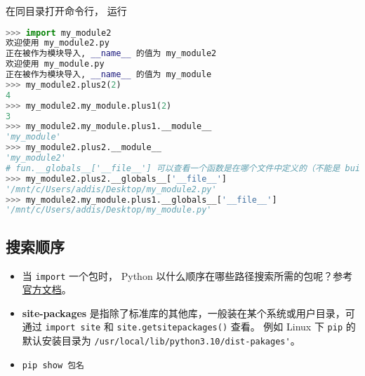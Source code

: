 在同目录打开命令行， 运行
\begin{lstlisting}[language=python]
>>> import my_module2
欢迎使用 my_module2.py
正在被作为模块导入, __name__ 的值为 my_module2
欢迎使用 my_module.py
正在被作为模块导入, __name__ 的值为 my_module
>>> my_module2.plus2(2)
4
>>> my_module2.my_module.plus1(2)
3
>>> my_module2.my_module.plus1.__module__
'my_module'
>>> my_module2.plus2.__module__
'my_module2'
# fun.__globals__['__file__'] 可以查看一个函数是在哪个文件中定义的（不能是 builtin 函数）。
>>> my_module2.plus2.__globals__['__file__']
'/mnt/c/Users/addis/Desktop/my_module2.py'
>>> my_module2.my_module.plus1.__globals__['__file__']
'/mnt/c/Users/addis/Desktop/my_module.py'
\end{lstlisting}

\subsection{搜索顺序}
\begin{itemize}
\item 当 \verb`import` 一个包时， Python 以什么顺序在哪些路径搜索所需的包呢？参考\href{https://docs.python.org/3/tutorial/modules.html#the-module-search-path}{官方文档}。
\item \textbf{site-packages} 是指除了标准库的其他库，一般装在某个系统或用户目录，可通过 \verb`import site` 和 \verb`site.getsitepackages()` 查看。  例如 Linux 下 \verb`pip` 的默认安装目录为 \verb`/usr/local/lib/python3.10/dist-pakages'`。
\item \verb`pip show 包名` 
\end{itemize}
